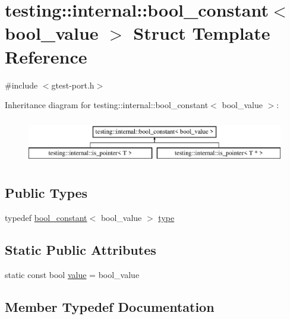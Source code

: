 \hypertarget{structtesting_1_1internal_1_1bool__constant}{}\section{testing\+::internal\+::bool\+\_\+constant$<$ bool\+\_\+value $>$ Struct Template Reference}
\label{structtesting_1_1internal_1_1bool__constant}


{\ttfamily \#include $<$gtest-\/port.\+h$>$}

Inheritance diagram for testing\+::internal\+::bool\+\_\+constant$<$ bool\+\_\+value $>$\+:\begin{figure}[H]
\begin{center}
\leavevmode
\includegraphics[height=2.000000cm]{structtesting_1_1internal_1_1bool__constant}
\end{center}
\end{figure}
\subsection*{Public Types}
\begin{DoxyCompactItemize}
\item 
typedef \mbox{\hyperlink{structtesting_1_1internal_1_1bool__constant}{bool\+\_\+constant}}$<$ bool\+\_\+value $>$ \mbox{\hyperlink{structtesting_1_1internal_1_1bool__constant_aba6d09ecf7eecea6c93480f0d627a167}{type}}
\end{DoxyCompactItemize}
\subsection*{Static Public Attributes}
\begin{DoxyCompactItemize}
\item 
static const bool \mbox{\hyperlink{structtesting_1_1internal_1_1bool__constant_a499fba6576296b04d99690a486424b32}{value}} = bool\+\_\+value
\end{DoxyCompactItemize}


\subsection{Member Typedef Documentation}
\mbox{\label{structtesting_1_1internal_1_1bool__constant_aba6d09ecf7eecea6c93480f0d627a167}} 
